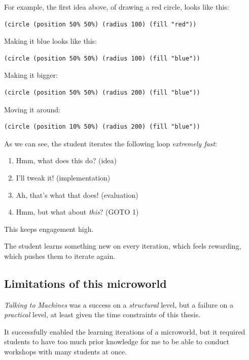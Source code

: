 For example, the first idea above, of drawing a red circle, looks like
this: 

\begin{verbatim}
(circle (position 50% 50%) (radius 100) (fill "red"))
\end{verbatim}

Making it blue looks like this:

\begin{verbatim}
(circle (position 50% 50%) (radius 100) (fill "blue"))
\end{verbatim}

Making it bigger:

\begin{verbatim}
(circle (position 50% 50%) (radius 200) (fill "blue"))
\end{verbatim}

Moving it around: 

\begin{verbatim}
(circle (position 10% 50%) (radius 200) (fill "blue"))
\end{verbatim}

As we can see, the student iterates the following loop \emph{extremely fast}: 

\begin{enumerate}
\item Hmm, what does this do? (idea) 
\item I'll tweak it! (implementation) 
\item Ah, that's what that does! (evaluation) 
\item Hmm, but what about \emph{this}? (GOTO 1) 
\end{enumerate}

This keeps engagement high.

The student learns something new on every iteration, which feels rewarding,
which pushes them to iterate again.

\subsection{Limitations of this microworld}

\emph{Talking to Machines} was a success on a \emph{structural} level,
but a failure on a \emph{practical} level, at least given the time
constraints of this thesis.

It successfully enabled the learning iterations of a microworld, but it
required students to have too much prior knowledge for me to be able to
conduct workshops with many students at once.

